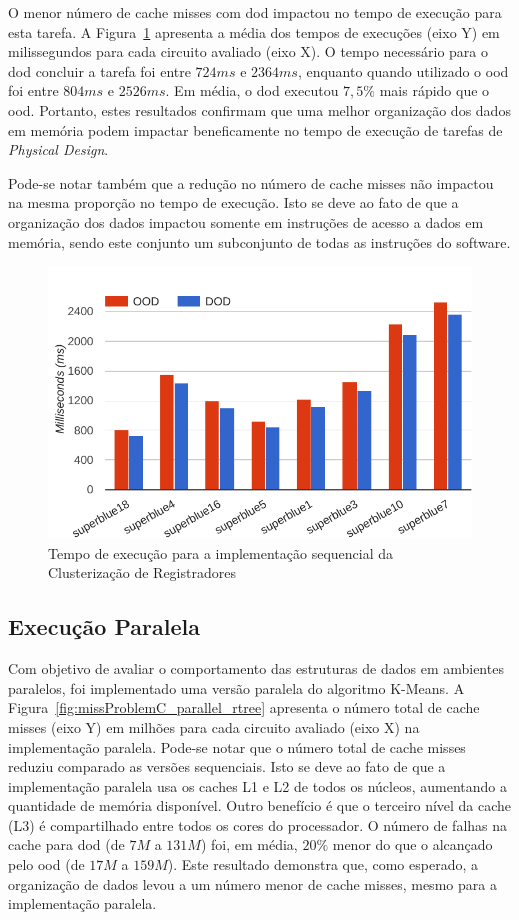 O menor número de cache misses com \ac{dod} impactou no tempo de execução para esta tarefa.
A Figura~\ref{fig:runtimeProblemC_sequential_rtree} apresenta a média dos tempos de execuções (eixo Y) em milissegundos para cada circuito avaliado (eixo X).
O tempo necessário para o \ac{dod} concluir a tarefa foi entre $724ms$ e $2364ms$, enquanto quando utilizado o \ac{ood} foi entre $804ms$ e $2526ms$.
Em média, o \ac{dod} executou $7,5\%$ mais rápido que o \ac{ood}.
Portanto, estes resultados confirmam que uma melhor organização dos dados em memória podem impactar beneficamente no tempo de execução de tarefas de \textit{Physical Design}.

Pode-se notar também que a redução no número de cache misses não impactou na mesma proporção no tempo de execução. Isto se deve ao fato de que a organização dos dados impactou somente em instruções de acesso a dados em memória, sendo este conjunto um subconjunto de todas as instruções do software.

\begin{figure}[ht]
    \centering
    \includegraphics[width=0.7\linewidth]{img/results/runtimeProblemC_sequential_rtree}
    \caption[Tempo de execução Problema~C versão sequencial]{Tempo de execução para a implementação sequencial da Clusterização de Registradores}
    \label{fig:runtimeProblemC_sequential_rtree}
\end{figure}

\subsection{Execução Paralela}
\label{subsec:execucaoParalelaProblemaC}

Com objetivo de avaliar o comportamento das estruturas de dados em ambientes paralelos, foi implementado uma versão paralela do algoritmo K-Means.
A Figura~\ref{fig:missProblemC_parallel_rtree} apresenta o número total de cache misses (eixo Y) em milhões para cada circuito avaliado (eixo X) na implementação paralela.
Pode-se notar que o número total de cache misses reduziu comparado as versões sequenciais. Isto se deve ao fato de que a implementação paralela usa os caches L1 e L2 de todos os núcleos, aumentando a quantidade de memória disponível. Outro benefício é que o terceiro nível da cache (L3) é compartilhado entre todos os cores do processador.
O número de falhas na cache para \ac{dod} (de $7M$ a $131M$) foi, em média, $20\%$ menor do que o alcançado pelo \ac{ood} (de $17M$ a $159M$). Este resultado demonstra que, como esperado, a organização de dados levou a um número menor de cache misses, mesmo para a implementação paralela.

